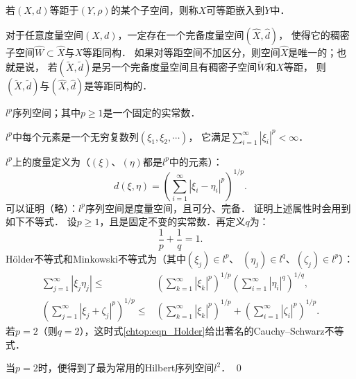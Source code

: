 若$(X,d)$等距于$(Y, \rho)$的某个子空间，则称$X$可等距嵌入到$Y$中．

\begin{theorem}\label{chtop:thm_iso-DS}
	对于任意度量空间$(X, d)$，一定存在一个完备度量空间$(\hat{X}, \hat{d})$，
	使得它的稠密子空间$\widehat{W} \subset \hat{X}$与$X$等距同构．
	如果对等距空间不加区分，则空间$\hat{X}$是唯一的；也就是说，
	若$(\tilde{X},\tilde{d})$是另一个完备度量空间且有稠密子空间$\widetilde{W}$和$X$等距，
	则$(\tilde{X},\tilde{d})$与$(\hat{X}, \hat{d})$是等距同构的．
\end{theorem}



\begin{example}\label{chtop:exam_lp}
	$l^p$序列空间；其中$p \geqslant 1$是一个固定的实常数．
\end{example}

$l^p$中每个元素是一个无穷复数列$\left(\xi_1, \xi_2, \cdots\right)$，
它满足$\sum_{i=1}^{\infty}\left|\xi_i\right|^p<\infty$．

$l^p$上的度量定义为（$(\xi)$、$(\eta)$都是$l^p$中的元素）：
\begin{equation}
	d(\xi, \eta)=\left(\sum_{i=1}^{\infty}\left|\xi_i-\eta_i\right|^p\right)^{1 / p} .
\end{equation}
可以证明（略）：$l^p$序列空间是度量空间，且可分、完备．
证明上述属性时会用到如下不等式．
设$p\geqslant 1$，且是固定不变的实常数．再定义$q$为：
\begin{equation}
	\frac{1}{p}+\frac{1}{q}=1 .
\end{equation}
H{\"o}lder不等式和Minkowski不等式为（其中$\left(\xi_{j}\right) \in l^{p}$、
$\left(\eta_{j}\right) \in l^{q}$、$\left(\zeta_{j}\right) \in l^{p}$）：
\begin{align}
	\sum_{j=1}^{\infty}\left|\xi_{j} \eta_{j}\right| \leqslant & 
	\left(\sum_{k=1}^{\infty}\left|\xi_{k}\right|^{p}\right)^{1 / p}
	\left(\sum_{i=1}^{\infty}\left|\eta_{i}\right|^{q}\right)^{1 / q}, \label{chtop:eqn_Holder} \\
	\left(\sum_{j=1}^{\infty}\left|\xi_{j}+\zeta_{j}\right|^{p}\right)^{1 / p} \leqslant &
	\left(\sum_{k=1}^{\infty}\left|\xi_{k}\right|^{p}\right)^{1 / p}
	+\left(\sum_{i=1}^{\infty}\left|\zeta_{i}\right|^{p}\right)^{1 / p}. \label{chtop:eqn_Minkowski} 
\end{align}
若$p=2$（则$q=2$），这时式\eqref{chtop:eqn_Holder}给出著名的Cauchy--Schwarz不等式．


当$p=2$时，便得到了最为常用的Hilbert序列空间$l^2$．
\qed

